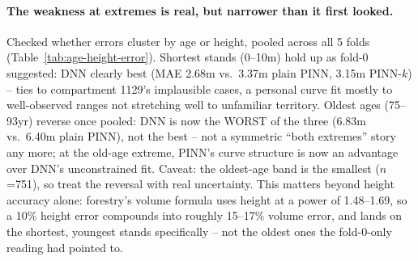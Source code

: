 \paragraph*{The weakness at extremes is real, but narrower than it first looked.}
Checked whether errors cluster by age or height, pooled across all 5 folds
(Table~\ref{tab:age-height-error}). Shortest stands (0--10m) hold up as fold-0 suggested: DNN
clearly best (MAE 2.68m vs.\ 3.37m plain PINN, 3.15m PINN-$k$) -- ties to compartment 1129's
implausible cases, a personal curve fit mostly to well-observed ranges not stretching well to
unfamiliar territory. Oldest ages (75--93yr) reverse once pooled: DNN is now the WORST of the
three (6.83m vs.\ 6.40m plain PINN), not the best -- not a symmetric ``both extremes'' story any
more; at the old-age extreme, PINN's curve structure is now an advantage over DNN's unconstrained
fit. Caveat: the oldest-age band is the smallest ($n$=751), so treat the reversal with real
uncertainty. This matters beyond height accuracy alone: forestry's volume formula uses height at
a power of 1.48--1.69, so a 10\% height error compounds into roughly 15--17\% volume error, and
lands on the shortest, youngest stands specifically -- not the oldest ones the fold-0-only
reading had pointed to.


